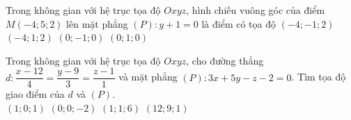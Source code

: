 \begin{ex}%
Trong không gian với hệ trục tọa độ $Oxyz$, hình chiếu vuông góc của điểm $M(-4;5;2)$ lên mặt phẳng $(P):y+1=0$ là điểm có tọa độ
\choice
{\True $(-4;-1;2)$}
{$(-4;1;2)$}
{$(0;-1;0)$}
{$(0;1;0)$}
\end{ex}

\begin{ex}%
Trong không gian với hệ trục tọa độ $Oxyz$, cho đường thẳng $d:\dfrac{x-12}{4}=\dfrac{y-9}{3}=\dfrac{z-1}{1}$ và mặt phẳng $(P):3x+5y-z-2=0$. Tìm tọa độ giao điểm của $d$ và $(P)$.\\
\choice
{$(1;0;1)$}
{\True $(0;0;-2)$}
{$(1;1;6)$}
{$(12;9;1)$}
\end{ex}

